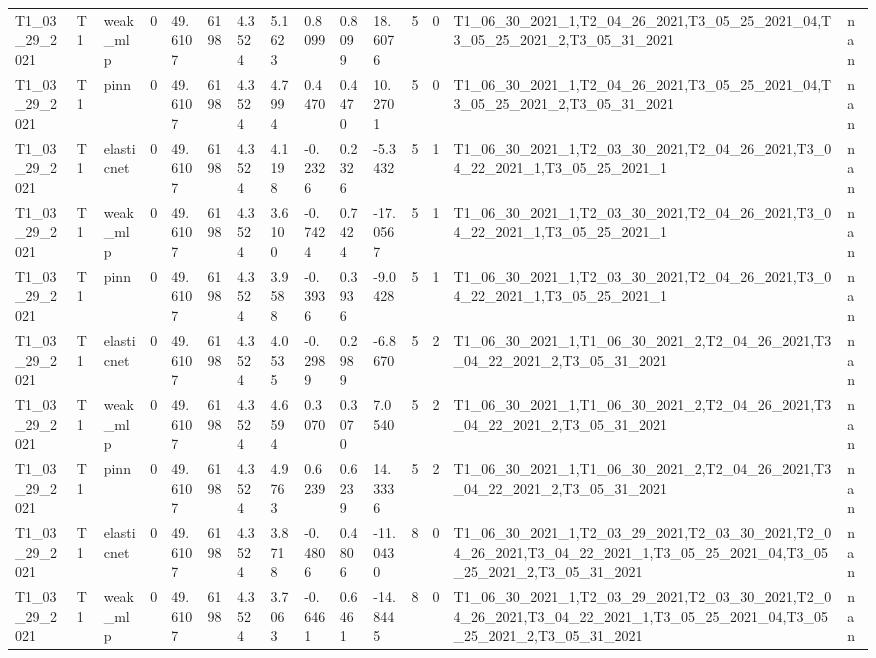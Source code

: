 \begin{table}[t]
\begin{tabular}{lllllllllllllll}
T1\_03\_29\_2021 & T1 & weak\_mlp & 0 & 49.6107 & 6198 & 4.3524 & 5.1623 & 0.8099 & 0.8099 & 18.6076 & 5 & 0 & T1\_06\_30\_2021\_1,T2\_04\_26\_2021,T3\_05\_25\_2021\_04,T3\_05\_25\_2021\_2,T3\_05\_31\_2021 & nan \\
T1\_03\_29\_2021 & T1 & pinn & 0 & 49.6107 & 6198 & 4.3524 & 4.7994 & 0.4470 & 0.4470 & 10.2701 & 5 & 0 & T1\_06\_30\_2021\_1,T2\_04\_26\_2021,T3\_05\_25\_2021\_04,T3\_05\_25\_2021\_2,T3\_05\_31\_2021 & nan \\
T1\_03\_29\_2021 & T1 & elasticnet & 0 & 49.6107 & 6198 & 4.3524 & 4.1198 & -0.2326 & 0.2326 & -5.3432 & 5 & 1 & T1\_06\_30\_2021\_1,T2\_03\_30\_2021,T2\_04\_26\_2021,T3\_04\_22\_2021\_1,T3\_05\_25\_2021\_1 & nan \\
T1\_03\_29\_2021 & T1 & weak\_mlp & 0 & 49.6107 & 6198 & 4.3524 & 3.6100 & -0.7424 & 0.7424 & -17.0567 & 5 & 1 & T1\_06\_30\_2021\_1,T2\_03\_30\_2021,T2\_04\_26\_2021,T3\_04\_22\_2021\_1,T3\_05\_25\_2021\_1 & nan \\
T1\_03\_29\_2021 & T1 & pinn & 0 & 49.6107 & 6198 & 4.3524 & 3.9588 & -0.3936 & 0.3936 & -9.0428 & 5 & 1 & T1\_06\_30\_2021\_1,T2\_03\_30\_2021,T2\_04\_26\_2021,T3\_04\_22\_2021\_1,T3\_05\_25\_2021\_1 & nan \\
T1\_03\_29\_2021 & T1 & elasticnet & 0 & 49.6107 & 6198 & 4.3524 & 4.0535 & -0.2989 & 0.2989 & -6.8670 & 5 & 2 & T1\_06\_30\_2021\_1,T1\_06\_30\_2021\_2,T2\_04\_26\_2021,T3\_04\_22\_2021\_2,T3\_05\_31\_2021 & nan \\
T1\_03\_29\_2021 & T1 & weak\_mlp & 0 & 49.6107 & 6198 & 4.3524 & 4.6594 & 0.3070 & 0.3070 & 7.0540 & 5 & 2 & T1\_06\_30\_2021\_1,T1\_06\_30\_2021\_2,T2\_04\_26\_2021,T3\_04\_22\_2021\_2,T3\_05\_31\_2021 & nan \\
T1\_03\_29\_2021 & T1 & pinn & 0 & 49.6107 & 6198 & 4.3524 & 4.9763 & 0.6239 & 0.6239 & 14.3336 & 5 & 2 & T1\_06\_30\_2021\_1,T1\_06\_30\_2021\_2,T2\_04\_26\_2021,T3\_04\_22\_2021\_2,T3\_05\_31\_2021 & nan \\
T1\_03\_29\_2021 & T1 & elasticnet & 0 & 49.6107 & 6198 & 4.3524 & 3.8718 & -0.4806 & 0.4806 & -11.0430 & 8 & 0 & T1\_06\_30\_2021\_1,T2\_03\_29\_2021,T2\_03\_30\_2021,T2\_04\_26\_2021,T3\_04\_22\_2021\_1,T3\_05\_25\_2021\_04,T3\_05\_25\_2021\_2,T3\_05\_31\_2021 & nan \\
T1\_03\_29\_2021 & T1 & weak\_mlp & 0 & 49.6107 & 6198 & 4.3524 & 3.7063 & -0.6461 & 0.6461 & -14.8445 & 8 & 0 & T1\_06\_30\_2021\_1,T2\_03\_29\_2021,T2\_03\_30\_2021,T2\_04\_26\_2021,T3\_04\_22\_2021\_1,T3\_05\_25\_2021\_04,T3\_05\_25\_2021\_2,T3\_05\_31\_2021 & nan \\

\end{tabular}
\end{table}
